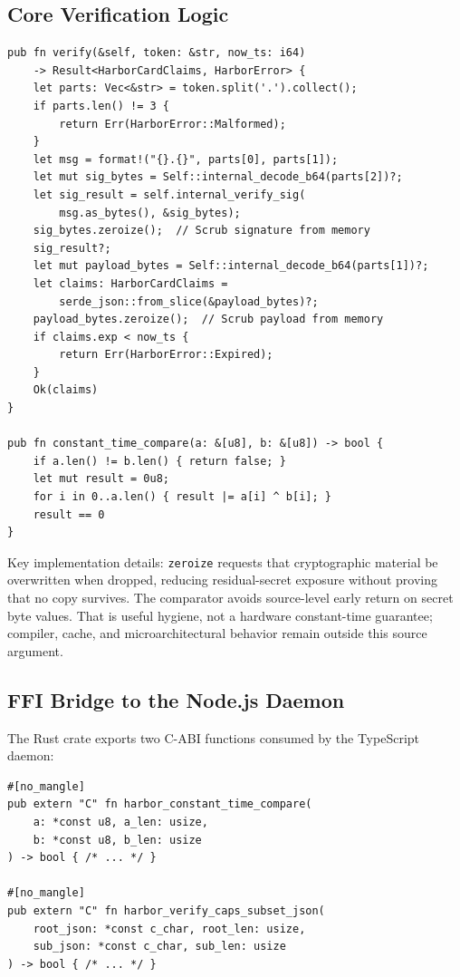 \documentclass[11pt,a4paper]{article}
\theoremstyle{definition}
\begin{document}
\subsection{Core Verification Logic}

\begin{lstlisting}[style=rust, caption={Deployed Rust Implementation — Harbor Card Verifier (abridged from the \texttt{harbor-card-rs} crate)}]
pub fn verify(&self, token: &str, now_ts: i64)
    -> Result<HarborCardClaims, HarborError> {
    let parts: Vec<&str> = token.split('.').collect();
    if parts.len() != 3 {
        return Err(HarborError::Malformed);
    }
    let msg = format!("{}.{}", parts[0], parts[1]);
    let mut sig_bytes = Self::internal_decode_b64(parts[2])?;
    let sig_result = self.internal_verify_sig(
        msg.as_bytes(), &sig_bytes);
    sig_bytes.zeroize();  // Scrub signature from memory
    sig_result?;
    let mut payload_bytes = Self::internal_decode_b64(parts[1])?;
    let claims: HarborCardClaims =
        serde_json::from_slice(&payload_bytes)?;
    payload_bytes.zeroize();  // Scrub payload from memory
    if claims.exp < now_ts {
        return Err(HarborError::Expired);
    }
    Ok(claims)
}

pub fn constant_time_compare(a: &[u8], b: &[u8]) -> bool {
    if a.len() != b.len() { return false; }
    let mut result = 0u8;
    for i in 0..a.len() { result |= a[i] ^ b[i]; }
    result == 0
}
\end{lstlisting}

Key implementation details: \texttt{zeroize} requests that cryptographic material be overwritten when dropped, reducing residual-secret exposure without proving that no copy survives. The comparator avoids source-level early return on secret byte values. That is useful hygiene, not a hardware constant-time guarantee; compiler, cache, and microarchitectural behavior remain outside this source argument.

\subsection{FFI Bridge to the Node.js Daemon}

The Rust crate exports two C-ABI functions consumed by the TypeScript daemon:

\begin{lstlisting}[style=rust, caption={FFI Exports — Called from the daemon's Arbiter module}]
#[no_mangle]
pub extern "C" fn harbor_constant_time_compare(
    a: *const u8, a_len: usize,
    b: *const u8, b_len: usize
) -> bool { /* ... */ }

#[no_mangle]
pub extern "C" fn harbor_verify_caps_subset_json(
    root_json: *const c_char, root_len: usize,
    sub_json: *const c_char, sub_len: usize
) -> bool { /* ... */ }
\end{lstlisting}
\end{document}
